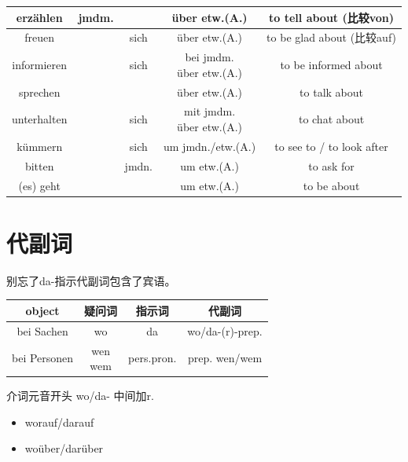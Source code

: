\begin{center}
\begin{longtable}{|c|c|c|c|c|}
        \hline
        erzählen      & jmdm. &       & über etw.(A.)       & to tell about (比较von)     \\
        \hline
        freuen        &       & sich  & über etw.(A.)       & to be glad about (比较auf)  \\
        \hline
        informieren   &       & sich  & \makecell{bei jmdm.                             \\ über etw.(A.)}       & to be informed about \\
        \hline
        sprechen      &       &       & über etw.(A.)       & to talk about             \\
        \hline
        unterhalten   &       & sich  & \makecell{mit jmdm.                             \\ über etw.(A.)}               & to chat about            \\
        \hhline{|=====|}
        kümmern       &       & sich  & um jmdn./etw.(A.)   & to see to / to look after \\
        \hline
        bitten        &       & jmdn. & um etw.(A.)         & to ask for                \\
        \hline
        (es) geht     &       &       & um etw.(A.)         & to be about               \\
        \hline
    \end{longtable}
\end{center}

\section{代副词}
别忘了da-指示代副词包含了宾语。

\begin{center}
    \begin{tabular}{|c|c|c|c|}
        \hline
        \rowcolor{gray}
        object       & 疑问词           & 指示词 & 代副词             \\
        \hline
        bei Sachen   & wo            & da  & wo/da-(r)-prep. \\
        \hline
        bei Personen & \makecell{wen                         \\ wem} & pers.pron. & prep. wen/wem   \\
        \hline
    \end{tabular}
\end{center}

介词元音开头 wo/da- 中间加r.
\begin{itemize}
    \item worauf/darauf
    \item woüber/darüber
\end{itemize}

